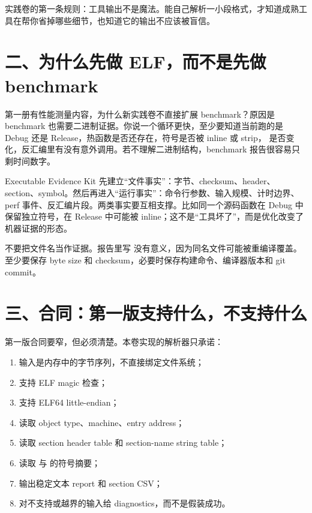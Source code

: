 \begin{keyidea}
实践卷的第一条规则：工具输出不是魔法。能自己解析一小段格式，才知道成熟工具在帮你省掉哪些细节，也知道它的输出不应该被盲信。
\end{keyidea}

\section{二、为什么先做 ELF，而不是先做 benchmark}

第一册有性能测量内容，为什么新实践卷不直接扩展 benchmark？原因是 benchmark 也需要二进制证据。你说一个循环更快，至少要知道当前跑的是 Debug 还是 Release，热函数是否还存在，符号是否被 inline 或 strip， 是否变化，反汇编里有没有意外调用。若不理解二进制结构，benchmark 报告很容易只剩时间数字。

Executable Evidence Kit 先建立“文件事实”：字节、checksum、header、section、symbol。然后再进入“运行事实”：命令行参数、输入规模、计时边界、perf 事件、反汇编片段。两类事实要互相支撑。比如同一个源码函数在 Debug 中保留独立符号，在 Release 中可能被 inline；这不是“工具坏了”，而是优化改变了机器证据的形态。

\begin{warningbox}
不要把文件名当作证据。报告里写  没有意义，因为同名文件可能被重编译覆盖。至少要保存 byte size 和 checksum，必要时保存构建命令、编译器版本和 git commit。
\end{warningbox}

\section{三、合同：第一版支持什么，不支持什么}

第一版合同要窄，但必须清楚。本卷实现的解析器只承诺：

\begin{enumerate}
  \item 输入是内存中的字节序列，不直接绑定文件系统；
  \item 支持 ELF magic 检查；
  \item 支持 ELF64 little-endian；
  \item 读取 object type、machine、entry address；
  \item 读取 section header table 和 section-name string table；
  \item 读取  与  的符号摘要；
  \item 输出稳定文本 report 和 section CSV；
  \item 对不支持或越界的输入给 diagnostics，而不是假装成功。
\end{enumerate}

